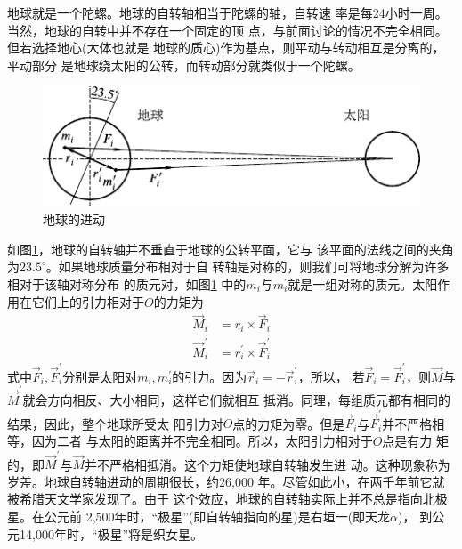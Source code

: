 \clearpage
地球就是一个陀螺。地球的自转轴相当于陀螺的轴，自转速
率是每24小时一周。当然，地球的自转中并不存在一个固定的顶
点，与前面讨论的情况不完全相同。但若选择地心(大体也就是
地球的质心)作为基点，则平动与转动相互是分离的，平动部分
是地球绕太阳的公转，而转动部分就类似于一个陀螺。

\vspace{1.5em}
\begin{figure}[h]
  \centering
  \includegraphics{figure/fig10.23}
  \caption{地球的进动}
  \label{fig:10.23}
\end{figure}

如图\ref{fig:10.23}，地球的自转轴并不垂直于地球的公转平面，它与
该平面的法线之间的夹角为$ 23.5 ^ \circ $。如果地球质量分布相对于自
转轴是对称的，则我们可将地球分解为许多相对于该轴对称分布
的质元对，如图\ref{fig:10.23} 中的$ m _ i $与$ m _ i ^ \prime $就是一组对称的质元。太阳作
用在它们上的引力相对于$ O $的力矩为
\begin{equation*}
  \begin{split}
    \vec{M} _ { i } &= r _ { i } \times \vec{F} _ i \\
    \vec{M} _ { i } ^ { \prime } &= r _ { i } ^ { \prime } \times \vec{F} _ i ^ \prime
  \end{split}
\end{equation*}
式中$ \vec{F} _ i, \vec{F} _ i ^ \prime$分别是太阳对$ m _ i , m _ i ^ \prime $的引力。因为$ \vec{r} _ i = - \vec{r} _i ^ \prime $，所以，
若$ \vec{F} _ i = \vec{F} _ i ^ \prime $，则$\vec{M}$与$\vec{M} ^ \prime$就会方向相反、大小相同，这样它们就相互
抵消。同理，每组质元都有相同的结果，因此，整个地球所受太
阳引力对$ O $点的力矩为零。但是$ \vec{F} _ i $与$ \vec{F} _ i ^ \prime $并不严格相等，因为二者
与太阳的距离并不完全相同。所以，太阳引力相对于$ O $点是有力
矩的，即$\vec{M} ^ \prime$与$\vec{M}$并不严格相抵消。这个力矩使地球自转轴发生进
动。这种现象称为岁差。地球自转轴进动的周期很长，约26,000
年。尽管如此小，在两千年前它就被希腊天文学家发现了。由于
这个效应，地球的自转轴实际上并不总是指向北极星。在公元前
2,500年时，“极星”(即自转轴指向的星)是右垣一(即天龙$ \alpha $)，
到公元14,000年时，“极星”将是织女星。
